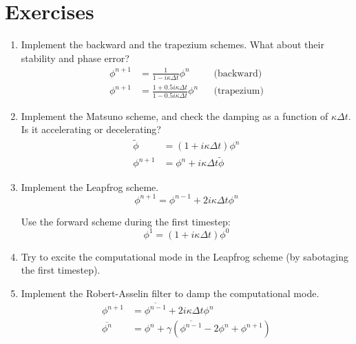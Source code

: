 \documentclass[a4paper]{article}
\begin{document}
\section{Exercises}
%
\begin{enumerate}
	\item Implement the backward and the trapezium schemes. What about their stability and phase error?
		\begin{align*}
			\phi^{n+1}&=\frac{1}{1-i\kappa\Delta t}\phi^n&&\text{(backward)}	\\
			\phi^{n+1}&=\frac{1+0.5i\kappa\Delta t}{1-0.5i\kappa\Delta t}\phi^n&&\text{(trapezium)}
		\end{align*}
	\item Implement the Matsuno scheme, and check the damping as a function of $\kappa\Delta t$. Is it accelerating or decelerating?
		\begin{align*}
			\tilde\phi&=(1+i\kappa\Delta t)\phi^{n}\\
			\phi^{n+1}&=\phi^n+i\kappa\Delta t\tilde\phi
		\end{align*}
	\item Implement the Leapfrog scheme.
		\begin{equation*}
			\phi^{n+1}=\phi^{n-1}+2i\kappa\Delta t\phi^{n}
		\end{equation*}
		\par
		Use the forward scheme during the first timestep:
		\begin{equation*}
			\phi^{1}=(1+i\kappa\Delta t)\phi^{0}
		\end{equation*}
		
	\item Try to excite the computational mode in the Leapfrog scheme (by sabotaging the first timestep).
	\item Implement the Robert-Asselin filter to damp the computational mode.
		\begin{align*}
			\phi^{n+1}&=\overline{\phi^{n-1}}+2i\kappa\Delta t\phi^{n}\\
			\overline{\phi^n}&=\phi^n+\gamma\left(\overline{\phi^{n-1}}-2\phi^n+\phi^{n+1}\right)
		\end{align*}
\end{enumerate}
%
\clearpage\appendix
\end{document}
